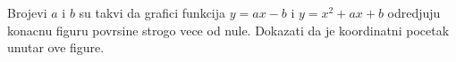 \problem
Brojevi $a$ i $b$ su takvi da grafici funkcija $y = ax - b$ i $y = x^2 + ax +b$ odredjuju konacnu figuru povrsine strogo vece od nule.
Dokazati da je koordinatni pocetak unutar ove figure.
\solution
\endproblem
